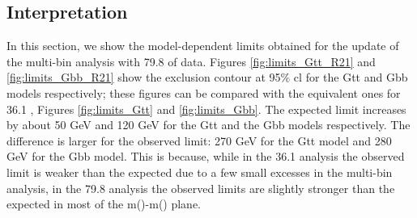 \FloatBarrier

\subsection{Interpretation}

In this section, we show the model-dependent limits obtained for the update of the multi-bin analysis with 79.8 \ifb of data. 
Figures \ref{fig:limits_Gtt_R21} and \ref{fig:limits_Gbb_R21} show the exclusion contour at 95\% \gls{cl} for the Gtt and Gbb 
models respectively; these figures can be compared with the equivalent ones for 36.1 \ifb, Figures \ref{fig:limits_Gtt} and 
\ref{fig:limits_Gbb}. 
The expected limit increases by about 50 GeV and 120 GeV for the Gtt and the Gbb models respectively. 
The difference is larger for the observed limit: 270 GeV for the Gtt model and 280 GeV for the Gbb model. 
This is because, while in the 36.1 \ifb analysis the observed limit is weaker than the expected due to 
a few small excesses in the multi-bin analysis, in the 79.8 \ifb 
analysis the observed limits are slightly stronger than the expected in most of the 
m(\gluino)-m(\ninoone) plane. 



